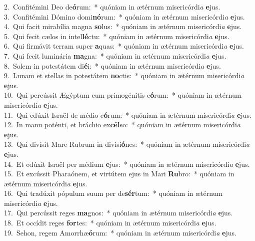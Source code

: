 {2.~}Confitémini Deo de\textbf{ó}rum:~* quóniam in ætérnum misericórdi\textit{a} \textbf{e}jus.\\
{3.~}Confitémini Dómino domi\textbf{nó}rum:~* quóniam in ætérnum misericórdi\textit{a} \textbf{e}jus.\\
{4.~}Qui facit mirabília magna \textbf{so}lus:~* quóniam in ætérnum misericórdi\textit{a} \textbf{e}jus.\\
{5.~}Qui fecit cælos in intel\textbf{lé}ctu:~* quóniam in ætérnum misericórdi\textit{a} \textbf{e}jus.\\
{6.~}Qui firmávit terram super \textbf{a}quas:~* quóniam in ætérnum misericórdi\textit{a} \textbf{e}jus.\\
{7.~}Qui fecit luminária \textbf{ma}gna:~* quóniam in ætérnum misericórdi\textit{a} \textbf{e}jus.\\
{8.~}Solem in potestátem di\textbf{é}i:~* quóniam in ætérnum misericórdi\textit{a} \textbf{e}jus.\\
{9.~}Lunam et stellas in potestátem \textbf{no}ctis:~* quóniam in ætérnum misericórdi\textit{a} \textbf{e}jus.\\
{10.~}Qui percússit Ægýptum cum primogénitis e\textbf{ó}rum:~* quóniam in ætérnum misericórdi\textit{a} \textbf{e}jus.\\
{11.~}Qui edúxit Israël de médio e\textbf{ó}rum:~* quóniam in ætérnum misericórdi\textit{a} \textbf{e}jus.\\
{12.~}In manu poténti, et bráchio ex\textbf{cél}so:~* quóniam in ætérnum misericórdi\textit{a} \textbf{e}jus.\\
{13.~}Qui divísit Mare Rubrum in divisi\textbf{ó}nes:~* quóniam in ætérnum misericórdi\textit{a} \textbf{e}jus.\\
{14.~}Et edúxit Israël per médium \textbf{e}jus:~* quóniam in ætérnum misericórdi\textit{a} \textbf{e}jus.\\
{15.~}Et excússit Pharaónem, et virtútem ejus in Mari \textbf{Ru}bro:~* quóniam in ætérnum misericórdi\textit{a} \textbf{e}jus.\\
{16.~}Qui tradúxit pópulum suum per de\textbf{sér}tum:~* quóniam in ætérnum misericórdi\textit{a} \textbf{e}jus.\\
{17.~}Qui percússit reges \textbf{ma}gnos:~* quóniam in ætérnum misericórdi\textit{a} \textbf{e}jus.\\
{18.~}Et occídit reges \textbf{for}tes:~* quóniam in ætérnum misericórdi\textit{a} \textbf{e}jus.\\
{19.~}Sehon, regem Amorrhæ\textbf{ó}rum:~* quóniam in ætérnum misericórdi\textit{a} \textbf{e}jus.\\
